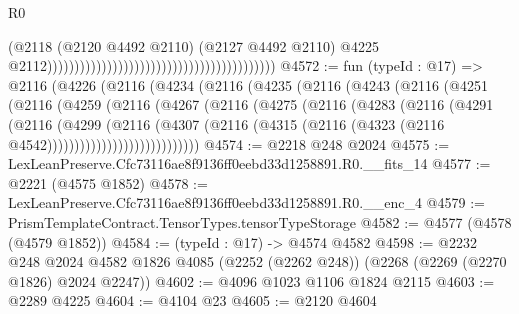 \begin{lexlean}{R0}
\begin{coremodule}
                                                                                      (@2118
                                                                                        (@2120
                                                                                          @4492
                                                                                          @2110)
                                                                                        (@2127
                                                                                          @4492
                                                                                          @2110)
                                                                                        @4225
                                                                                        @2112))))))))))))))))))))))))))))))))))))))))))
@4572 := fun (typeId : @17) =>
  @2116
    (@4226
      (@2116
        (@4234
          (@2116
            (@4235
              (@2116
                (@4243
                  (@2116
                    (@4251
                      (@2116
                        (@4259
                          (@2116
                            (@4267
                              (@2116
                                (@4275
                                  (@2116
                                    (@4283
                                      (@2116
                                        (@4291
                                          (@2116
                                            (@4299
                                              (@2116
                                                (@4307
                                                  (@2116
                                                    (@4315
                                                      (@2116
                                                        (@4323
                                                          (@2116 @4542))))))))))))))))))))))))))))
@4574 := @2218 @248 @2024
@4575 := LexLeanPreserve.Cfc73116ae8f9136ff0eebd33d1258891.R0.__fits_14
@4577 := @2221 (@4575 @1852)
@4578 := LexLeanPreserve.Cfc73116ae8f9136ff0eebd33d1258891.R0.__enc_4
@4579 := PrismTemplateContract.TensorTypes.tensorTypeStorage
@4582 := @4577 (@4578 (@4579 @1852))
@4584 := (typeId : @17) -> @4574 @4582
@4598 := @2232
    @248
    @2024
    @4582
    @1826
    @4085
    (@2252 (@2262 @248))
    (@2268 (@2269 (@2270 @1826) @2024 @2247))
@4602 := @4096 @1023 @1106 @1824 @2115
@4603 := @2289 @4225
@4604 := @4104 @23
@4605 := @2120 @4604

\end{coremodule}
\end{lexlean}
